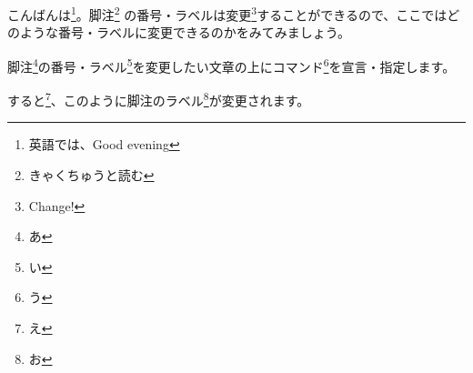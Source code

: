 \documentclass[a5j]{jarticle}
\begin{document}
 
こんばんは\footnote{英語では、Good evening}。脚注\footnote{きゃくちゅうと読む} の番号・ラベルは変更\footnote{Change!}することができるので、ここではどのような番号・ラベルに変更できるのかをみてみましょう。
 
\renewcommand{\thefootnote}{\fnsymbol{footnote}}
 
脚注\footnote{あ}の番号・ラベル\footnote{い}を変更したい文章の上にコマンド\footnote{う}を宣言・指定します。
 
\renewcommand{\thefootnote}{\roman{footnote}}
 
すると\footnote{え}、このように脚注のラベル\footnote{お}が変更されます。
 
\end{document}
